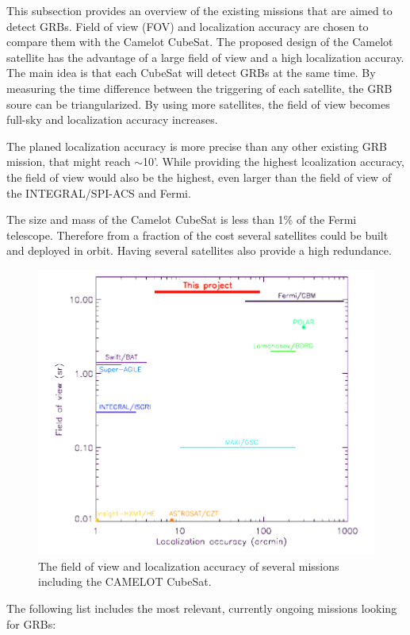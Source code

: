 \documentclass[12pt, a4paper,titlepage]{article}
\numberwithin{equation}{section}
\numberwithin{figure}{section}
\begin{document}
This subsection provides an overview of the existing missions that are aimed to detect GRBs. Field of view (FOV) and localization accuracy are chosen to compare them with the Camelot CubeSat. The proposed design of the Camelot satellite has the advantage of a large field of view and a high localization accuray. The main idea is that each CubeSat will detect GRBs at the same time. By measuring the time difference between the triggering of each satellite, the GRB soure can be triangularized. By using more satellites, the field of view becomes full-sky and localization accuracy increases.

The planed localization accuracy is more precise than any other existing GRB mission, that might reach $\sim$10'. While providing the highest lcoalization accuracy, the field of view would also be the highest, even larger than the field of view of the INTEGRAL/SPI-ACS and Fermi.

The size and mass of the Camelot CubeSat is less than 1\% of the Fermi telescope. Therefore from a fraction of the cost several satellites could be built and deployed in orbit. Having several satellites also provide a high redundance.

\begin{figure}[H]
\centering
\includegraphics[width=130.0mm]{images/fovvsloc.png}
\caption{The field of view and localization accuracy of several missions including the CAMELOT CubeSat.}
\end{figure}

The following list includes the most relevant, currently ongoing missions looking for GRBs:
\end{document}
